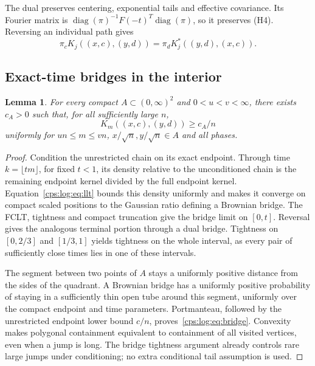 \documentclass[11pt,letterpaper]{article}
\numberwithin{equation}{section}
\newtheorem{lemma}[theorem]{Lemma}
\theoremstyle{remark}\newtheorem{remark}[theorem]{Remark}
\newcommand{\diag}{\operatorname{diag}}
\begin{document}
The dual preserves centering, exponential tails and effective covariance.
Its Fourier matrix is $\diag(\pi)^{-1}F(-t)^T\diag(\pi)$, so it preserves
(H4). Reversing an individual path gives
\begin{equation}\label{cps:log:eq:reversal}
 \pi_cK_j((x,c),(y,d))=\pi_dK_j^*((y,d),(x,c)).
\end{equation}

\subsection{Exact-time bridges in the interior}\label{cps:log:sec:bridge}
\begin{lemma}\label{cps:log:lem:bridge}
For every compact $A\subset(0,\infty)^2$ and $0<u<v<\infty$, there
exists $c_A>0$ such that, for all sufficiently large $n$,
\begin{equation}\label{cps:log:eq:bridge}
 K_m((x,c),(y,d))\ge c_A/n
\end{equation}
uniformly for $un\le m\le vn$, $x/\sqrt n,y/\sqrt n\in A$ and all phases.
\end{lemma}
\begin{proof}
Condition the unrestricted chain on its exact endpoint. Through time
$k=\lfloor tm\rfloor$, for fixed $t<1$, its density relative to the
unconditioned chain is the remaining endpoint kernel divided by the full
endpoint kernel. Equation~\eqref{cps:log:eq:llt} bounds this density uniformly
and makes it converge on compact scaled positions to the Gaussian
ratio defining a Brownian bridge. The FCLT, tightness and compact
truncation give the bridge limit on $[0,t]$. Reversal gives the analogous
terminal portion through a dual bridge. Tightness on $[0,2/3]$ and
$[1/3,1]$ yields tightness on the whole interval, as every pair of
sufficiently close times lies in one of these intervals.

The segment between two points of $A$ stays a uniformly positive
distance from the sides of the quadrant. A Brownian bridge has a
uniformly positive probability of staying in a sufficiently thin open
tube around this segment, uniformly over the compact endpoint and time
parameters. Portmanteau, followed by the unrestricted endpoint lower
bound $c/n$, proves~\eqref{cps:log:eq:bridge}. Convexity makes polygonal
containment equivalent to containment of all visited vertices, even
when a jump is long. The bridge tightness argument already controls
rare large jumps under conditioning; no extra conditional tail
assumption is used.
\end{proof}
\end{document}

